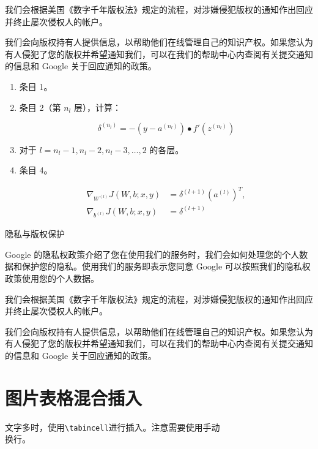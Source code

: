 我们会根据美国《数字千年版权法》规定的流程，对涉嫌侵犯版权的通知作出回应并终止屡次侵权人的帐户。

我们会向版权持有人提供信息，以帮助他们在线管理自己的知识产权。如果您认为有人侵犯了您的版权并希望通知我们，可以在我们的帮助中心内查阅有关提交通知的信息和 Google 关于回应通知的政策。

\begin{enumerate}

\item 条目 1。
\item 条目 2（第 $n_l$ 层），计算：

        $$
        \delta^{(n_l)} = - (y - a^{(n_l)}) \bullet f'(z^{(n_l)})
        $$ 

\item 对于 $l = n_l-1, n_l-2, n_l-3, \ldots, 2$ 的各层。
\item 条目 4。

        \[ 
        \begin{aligned}
        \nabla_{W^{(l)}} J(W,b;x,y) &= \delta^{(l+1)} (a^{(l)})^T, \\
        \nabla_{b^{(l)}} J(W,b;x,y) &= \delta^{(l+1)} 
        \end{aligned}
        \]
\end{enumerate}

隐私与版权保护

Google 的隐私权政策介绍了您在使用我们的服务时，我们会如何处理您的个人数据和保护您的隐私。使用我们的服务即表示您同意 Google 可以按照我们的隐私权政策使用您的个人数据。

我们会根据美国《数字千年版权法》规定的流程，对涉嫌侵犯版权的通知作出回应并终止屡次侵权人的帐户。

我们会向版权持有人提供信息，以帮助他们在线管理自己的知识产权。如果您认为有人侵犯了您的版权并希望通知我们，可以在我们的帮助中心内查阅有关提交通知的信息和 Google 关于回应通知的政策。

\section{图片表格混合插入}

文字多时，使用\verb|\tabincell|进行插入。注意需要使用手动\\
换行。

